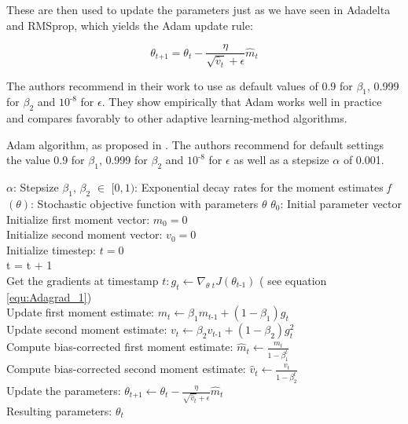 \documentclass[12pt,oneside,a4paper,parskip]{scrbook}
\begin{document}
These are then used to update the parameters just as we have seen in Adadelta and RMSprop, which yields the Adam update rule:

\begin{equation}
\theta_\textit{t+1} = \theta_\textit{t}-\frac{\eta}{\sqrt{\hat{v}_t} + \epsilon} \hat{m}_t
\label{equ:adam_3}
\end{equation}

The authors recommend in their work to use as default values of 0.9 for $\beta_1$, 0.999 for $\beta_2$ and $10^\textit{-8}$ for $\epsilon$.
They show empirically that Adam works well in practice and compares favorably to other adaptive learning-method algorithms.
\cite{overvieDiffRSLVQ, Kingma2014AdamAM}

\begin{algorithm}
  \caption{Adam algorithm, as proposed in \cite{Kingma2014AdamAM}. The authors recommend for default settings the value
          0.9 for $\beta_1$, 0.999 for $\beta_2$ and $10^\textit{-8}$ for $\epsilon$ as well as a stepsize $\alpha$ of 0.001.}\label{euclid}
  \begin{algorithmic}[1]
    \Require $\alpha$: Stepsize
    \Require $\beta_1$, $\beta_2$ $\in$ $[0,1)$: Exponential decay rates for the moment estimates
    \Require \textit{f}$(\theta)$: Stochastic objective function with parameters $\theta$
    \Require $\theta_0$: Initial parameter vector \\
    Initialize first moment vector: $m_0 = 0$ \\
    Initialize second moment vector: $v_0 = 0$ \\
    Initialize timestep: $t = 0$ 
     \\
      t = t + 1 \\
      Get the gradients at timestamp $\textit{t}: \textit{g}_t \leftarrow \nabla_\textit{$\theta$ t}\textit{J}(\theta_\textit{t-1})$ ( see equation \ref{equ:Adagrad_1}) \\
      Update first moment estimate: $\textit{m}_t \leftarrow \beta_1\textit{m}_\textit{t-1} + (1-\beta_1)\textit{g}_t$ \\
      Update second moment estimate: $\textit{v}_t \leftarrow \beta_2\textit{v}_\textit{t-1} + (1-\beta_2)\textit{g}^2_t$ \\
      Compute bias-corrected first moment estimate: $\hat{m}_t \leftarrow \frac{\textit{m}_t}{1-\beta^t_1}$ \\
      Compute bias-corrected second moment estimate: $\hat{v}_t \leftarrow \frac{\textit{v}_t}{1-\beta^t_2}$ \\
      Update the parameters: $\theta_\textit{t+1} \leftarrow \theta_\textit{t}-\frac{\eta}{\sqrt{\hat{v}_t}+ \epsilon} \hat{m}_t$ \\
    \EndWhile
    \Return Resulting parameters: $\theta_t$
  \end{algorithmic}
\end{algorithm}
\end{document}
